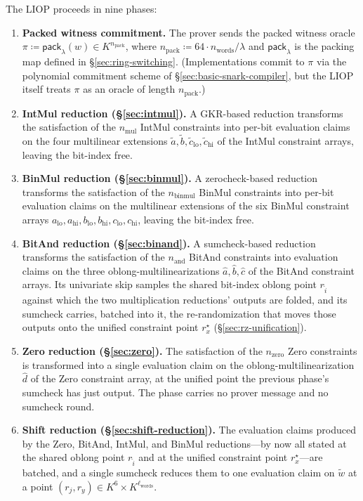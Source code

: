 \documentclass{article}
\theoremstyle{definition}
\newcommand*{\mle}{\widetilde}
\begin{document}
The LIOP proceeds in nine phases:
\begin{enumerate}
\item \textbf{Packed witness commitment.} The prover sends the packed witness oracle $\pi \coloneqq \textsf{pack}_\lambda(w) \in K^{n_\text{pack}}$, where $n_\text{pack} \coloneqq 64 \cdot n_\text{words} / \lambda$ and $\textsf{pack}_\lambda$ is the packing map defined in \S\ref{sec:ring-switching}. (Implementations commit to $\pi$ via the polynomial commitment scheme of \S\ref{sec:basic-snark-compiler}, but the LIOP itself treats $\pi$ as an oracle of length $n_\text{pack}$.)
\item \textbf{IntMul reduction (\S\ref{sec:intmul}).} A GKR-based reduction transforms the satisfaction of the $n_\text{mul}$ IntMul constraints into per-bit evaluation claims on the four multilinear extensions $\mle{a}, \mle{b}, \mle{c}_\text{lo}, \mle{c}_\text{hi}$ of the IntMul constraint arrays, leaving the bit-index free.
\item \textbf{BinMul reduction (\S\ref{sec:binmul}).} A zerocheck-based reduction transforms the satisfaction of the $n_\text{binmul}$ BinMul constraints into per-bit evaluation claims on the multilinear extensions of the six BinMul constraint arrays $a_\text{lo}, a_\text{hi}, b_\text{lo}, b_\text{hi}, c_\text{lo}, c_\text{hi}$, leaving the bit-index free.
\item \textbf{BitAnd reduction (\S\ref{sec:binand}).} A sumcheck-based reduction transforms the satisfaction of the $n_\text{and}$ BitAnd constraints into evaluation claims on the three oblong-multilinearizations $\widehat{a}, \widehat{b}, \widehat{c}$ of the BitAnd constraint arrays. Its univariate skip samples the shared bit-index oblong point $r_{\widehat{i}}$ against which the two multiplication reductions' outputs are folded, and its sumcheck carries, batched into it, the re-randomization that moves those outputs onto the unified constraint point $r^\star_x$ (\S\ref{sec:rz-unification}).
\item \textbf{Zero reduction (\S\ref{sec:zero}).} The satisfaction of the $n_\text{zero}$ Zero constraints is transformed into a single evaluation claim on the oblong-multilinearization $\widehat{d}$ of the Zero constraint array, at the unified point the previous phase's sumcheck has just output. The phase carries no prover message and no sumcheck round.
\item \textbf{Shift reduction (\S\ref{sec:shift-reduction}).} The evaluation claims produced by the Zero, BitAnd, IntMul, and BinMul reductions---by now all stated at the shared oblong point $r_{\widehat{i}}$ and at the unified constraint point $r^\star_x$---are batched, and a single sumcheck reduces them to one evaluation claim on $\mle{w}$ at a point $(r_j, r_y) \in K^6 \times K^{\ell_\text{words}}$.

\end{enumerate}
\end{document}
